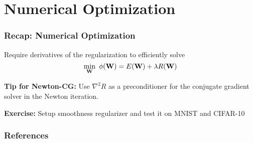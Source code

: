 \documentclass[12pt,fleqn,handout]{beamer}
\begin{document}
\section{Numerical Optimization} %
\label{sec:numerical_optimization}
\begin{frame}[fragile]\frametitle{Recap: Numerical Optimization}

Require derivatives of the regularization to efficiently solve
$$ \min_{{\bf W}} \ \phi({\bf W}) = E({\bf W}) + \lambda R({\bf W}) $$


\bigskip
\pause

{\bf Tip for Newton-CG:} Use $\nabla^2 R$ as a preconditioner for the conjugate gradient
solver in the Newton iteration. 

\bigskip
\pause
\textbf{Exercise:} Setup smoothness regularizer and test it on MNIST and CIFAR-10
\end{frame}



\begin{frame}[allowframebreaks]
	\frametitle{References}



\end{frame}
\end{document}
